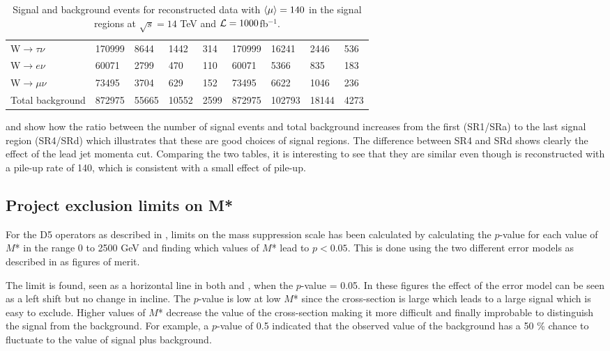 \begin{landscape}
\begin{table}[ht]
\begin{center}
\begin{tabular}{|l|l|l|l|l !{\vrule width 4pt} l|l|l|l|}
W$\rightarrow\tau\nu$ & 170999 & 8644 & 1442 & 314 & 170999 & 16241 & 2446 & 536 \\
W$\rightarrow e\nu$ & 60071 & 2799 & 470 & 110 & 60071 & 5366 & 835 & 183 \\
W$\rightarrow\mu\nu$ & 73495 & 3704 & 629 & 152 & 73495 & 6622 & 1046 & 236 \\ \hline
Total background & 872975 & 55665 & 10552 & 2599 & 872975 & 102793 & 18144 & 4273 \\ \hline 
\end{tabular}
\caption{Signal and background events for reconstructed data with $\left<\mu\right>=140$ in the signal regions at $\sqrt{s}=14$ TeV and $\mathcal{L}=1000$fb$^{-1}$.}
\label{tab:srreco1}
\end{center}
\end{table}
\end{landscape}

 and  show how the ratio between the number of signal events and total background increases from the first (SR1/SRa) to the last signal region (SR4/SRd) which illustrates that these are good choices of signal regions. The difference between SR4 and SRd shows clearly the effect of the lead jet momenta cut. Comparing the two tables, it is interesting to see that they are similar even though  is reconstructed with a pile-up rate of 140, which is consistent with a small effect of pile-up.
\subsection{Project exclusion limits on M*}\label{sec:res:subsec:m*}
For the D5 operators as described in , limits on the mass suppression scale has been calculated by calculating the $p$-value for each value of $M$* in the range 0 to 2500 GeV and finding which values of $M$* lead to $p<0.05$. This is done using the two different error models as described in  as figures of merit.

The limit is found, seen as a horizontal line in both  and , when the $p$-value = 0.05. In these figures the effect of the error model can be seen as a left shift but no change in incline. The $p$-value is low at low $M$* since the cross-section is large which leads to a large signal which is easy to exclude. Higher values of $M$* decrease the value of the cross-section making it more difficult and finally improbable to distinguish the signal from the background. For example, a $p$-value of 0.5 indicated that the observed value of the background has a 50 \% chance to fluctuate to the value of signal plus background.

